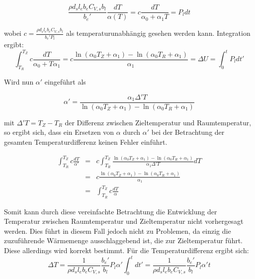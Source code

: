 \begin{equation}
 \frac{\rho d_sl_eb_eC_{V,s}b_l}{b_e'}\frac{dT}{\alpha(T)} = c \frac{dT}{\alpha_0 + \alpha_1 T} = P_l dt
 \label{eqn:alphaintpreconst}
\end{equation}

wobei $c = \frac{\rho d_sl_eb_eC_{V,s}b_l}{b_e'P_l}$ als temperaturunabhängig gesehen werden kann. Integration ergibt:
\begin{equation}
  \int_{T_R}^{T_Z}c\frac{dT}{\alpha_0 + T \alpha_1} = c\frac{\ln\left(\alpha_0 T_Z + \alpha_1\right)-\ln\left(\alpha_0 T_R + \alpha_1\right)}{\alpha_1} = \Delta U = \int_0^t P_l dt'
\end{equation}

Wird nun $\alpha'$ eingeführt als 

\begin{equation}
\alpha' = \frac{\alpha_1 \Delta' T}{\ln\left(\alpha_0 T_Z + \alpha_1\right)-\ln\left(\alpha_0 T_R + \alpha_1\right)}
\label{eqn:alphas}
\end{equation}

mit $\Delta'T = T_Z-T_R$ der Differenz zwischen Zieltemperatur und Raumtemperatur, so ergibt sich, dass ein Ersetzen von $\alpha$ durch $\alpha'$ bei der Betrachtung der gesamten Temperaturdifferenz keinen Fehler einführt.

\begin{eqnarray}
  \int_{T_R}^{T_Z}c\frac{dT}{\alpha'} &=& c\int_{T_R}^{T_Z}\frac{\ln\left(\alpha_0 T_Z + \alpha_1\right)-\ln\left(\alpha_0 T_R + \alpha_1\right)}{\alpha_1 \Delta' T} dT\\\nonumber
   &= &c\frac{\ln\left(\alpha_0 T_Z + \alpha_1\right)-\ln\left(\alpha_0 T_R + \alpha_1\right)}{\alpha_1}\\
   &= &\int_{T_R}^{T_Z}c\frac{dT}{\alpha}
\end{eqnarray}

Somit kann durch diese vereinfachte Betrachtung die Entwicklung der Temperatur zwischen Raumtemperatur und Zieltemperatur nicht vorhergesagt werden. Dies führt in diesem Fall jedoch nicht zu Problemen, da einzig die zuzuführende Wärmemenge ausschlaggebend ist, die zur Zieltemperatur führt. Diese allerdings wird korrekt bestimmt. Für die Temperaturdifferenz ergibt sich:
\begin{equation}
  \Delta T = \frac{1}{\rho d_s l_e b_e C_{V,s}} \frac{b_e'}{b_l} P_l \alpha' \int_{0}^{t}  dt' = \frac{1}{\rho d_s l_e b_e C_{V,s}} \frac{b_e'}{b_l} P_l \alpha' t
  \label{eqn:integrated}
\end{equation}

